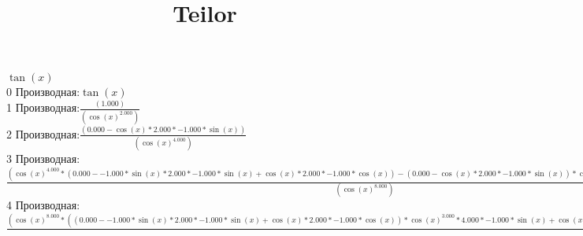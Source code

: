 \documentclass[a4paper, 12pt]{article}
\title{Teilor}
\begin{document}
\maketitle 
$\tan{(x)}$\\
0 Производная:$\tan{(x)}$\\
1 Производная:$\frac{({1.000})}{(\cos{(x)}^{2.000})}$\\
2 Производная:$\frac{({0.000}-\cos{(x)}*{2.000}*{-1.000}*\sin{(x)})}{(\cos{(x)}^{4.000})}$\\
3 Производная:$\frac{(\cos{(x)}^{4.000}*{({0.000}-{-1.000}*\sin{(x)}*{2.000}*{-1.000}*\sin{(x)}+\cos{(x)}*{2.000}*{-1.000}*\cos{(x)})}-{({0.000}-\cos{(x)}*{2.000}*{-1.000}*\sin{(x)})}*\cos{(x)}^{3.000}*{4.000}*{-1.000}*\sin{(x)})}{(\cos{(x)}^{8.000})}$\\
4 Производная:$\frac{(\cos{(x)}^{8.000}*{({({0.000}-{-1.000}*\sin{(x)}*{2.000}*{-1.000}*\sin{(x)}+\cos{(x)}*{2.000}*{-1.000}*\cos{(x)})}*\cos{(x)}^{3.000}*{4.000}*{-1.000}*\sin{(x)}+\cos{(x)}^{4.000}*{({0.000}-{2.000}*{-1.000}*\sin{(x)}*{-1.000}*\cos{(x)}+{-1.000}*\sin{(x)}*{2.000}*{-1.000}*\cos{(x)}+{-1.000}*\cos{(x)}*{2.000}*{-1.000}*\sin{(x)}+\cos{(x)}*{2.000}*{-1.000}*{-1.000}*\sin{(x)})}-\cos{(x)}^{3.000}*{4.000}*{-1.000}*\sin{(x)}*{({0.000}-{-1.000}*\sin{(x)}*{2.000}*{-1.000}*\sin{(x)}+\cos{(x)}*{2.000}*{-1.000}*\cos{(x)})}+{({0.000}-\cos{(x)}*{2.000}*{-1.000}*\sin{(x)})}*{({-1.000}*\sin{(x)}*{4.000}*\cos{(x)}^{2.000}*{3.000}*{-1.000}*\sin{(x)}+\cos{(x)}^{3.000}*{4.000}*{-1.000}*\cos{(x)})})}-{(\cos{(x)}^{4.000}*{({0.000}-{-1.000}*\sin{(x)}*{2.000}*{-1.000}*\sin{(x)}+\cos{(x)}*{2.000}*{-1.000}*\cos{(x)})}-{({0.000}-\cos{(x)}*{2.000}*{-1.000}*\sin{(x)})}*\cos{(x)}^{3.000}*{4.000}*{-1.000}*\sin{(x)})}*\cos{(x)}^{7.000}*{8.000}*{-1.000}*\sin{(x)})}{(\cos{(x)}^{16.000})}$\\
\end{document}
